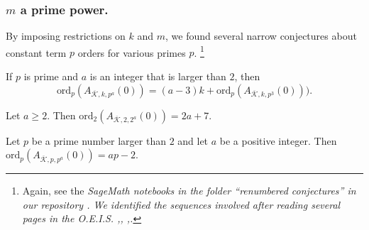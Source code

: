 \documentclass{article}
\begin{document}
\subsubsection[]{$m$ a prime power.}
By imposing 
restrictions on $k$ and $m$,
we found several narrow
conjectures  about constant term $p$ orders 
for various primes $p$.
\footnote{Again, see
the \it SageMath \rm
notebooks
in the folder ``renumbered conjectures''
in our repository
\cite{githubNewmanShanks}.
We identified the sequences 
involved after reading several pages in the O.E.I.S. 
\cite{OEISturpel},\cite{OEISgerasimov},
\cite{OEISsloane},\cite{OEISzum}.}
\begin{conjecture}
If $p$ is prime
and $a$ is an integer that is 
larger than $2$,
then
$$\text{ord}_p(A_{\overline{\mathcal{K}},k,p^a}(0)) 
=(a-3)k+
\text{ord}_p(A_{\overline{\mathcal{K}},k,p^3}(0))).
$$
\end{conjecture}
\begin{conjecture}
Let $a \geq 2$. Then
$\text{ord}_2(A_{\overline{\mathcal{K}},
2,2^a}(0)) = 2a+7$.
\end{conjecture}
\begin{conjecture}
Let $p$ be a prime number larger than $2$
and let $a$ be a positive integer. Then
$\text{ord}_p(A_{\overline{\mathcal{K}},p,p^a}(0))
= ap-2$.
\end{conjecture} \noindent
\end{document}
